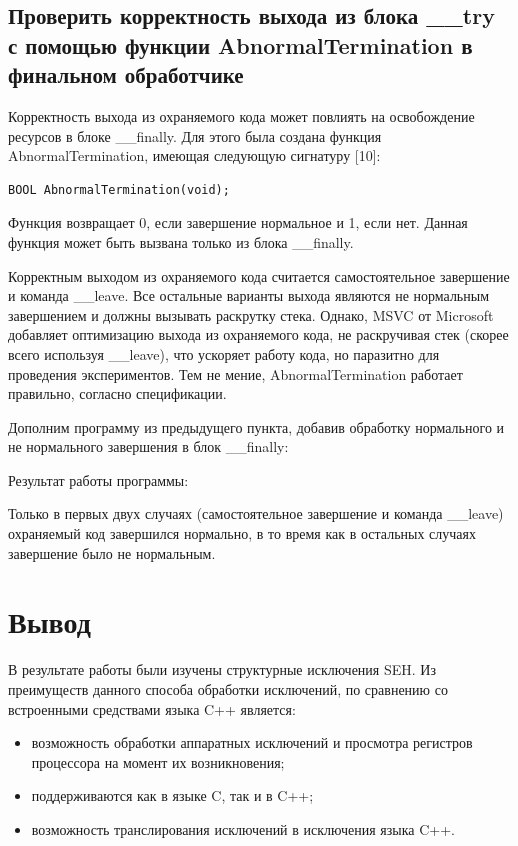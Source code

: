 \documentclass[14pt,a4paper,report]{report}
\begin{document}
\subsection{Проверить корректность выхода из блока \_\_try с помощью функции AbnormalTermination в финальном обработчике}

Корректность выхода из охраняемого кода может повлиять на освобождение ресурсов в блоке \_\_finally. Для этого была создана функция AbnormalTermination, имеющая следующую сигнатуру [10]:

\begin{lstlisting}
BOOL AbnormalTermination(void);
\end{lstlisting}

Функция возвращает 0, если завершение нормальное и 1, если нет. Данная функция может быть вызвана только из блока \_\_finally.

Корректным выходом из охраняемого кода считается самостоятельное завершение и команда \_\_leave. Все остальные варианты выхода являются не нормальным завершением и должны вызывать раскрутку стека. Однако, MSVC от Microsoft добавляет оптимизацию выхода из охраняемого кода, не раскручивая стек (скорее всего используя \_\_leave), что ускоряет работу кода, но паразитно для проведения экспериментов. Тем не мение, AbnormalTermination работает правильно, согласно спецификации.

Дополним программу из предыдущего пункта, добавив обработку нормального и не нормального завершения в блок \_\_finally:



Результат работы программы:



Только в первых двух случаях (самостоятельное завершение и команда \_\_leave) охраняемый код завершился нормально, в то время как в остальных случаях завершение было не нормальным.

\clearpage

\section{Вывод}

В результате работы были изучены структурные исключения SEH. Из преимуществ данного способа обработки исключений, по сравнению со встроенными средствами языка C++ является:

\begin{itemize}
	\item возможность обработки аппаратных исключений и просмотра регистров процессора на момент их возникновения;
	\item поддерживаются как в языке C, так и в C++;
	\item возможность транслирования исключений в исключения языка C++.
\end{itemize}
\end{document}
